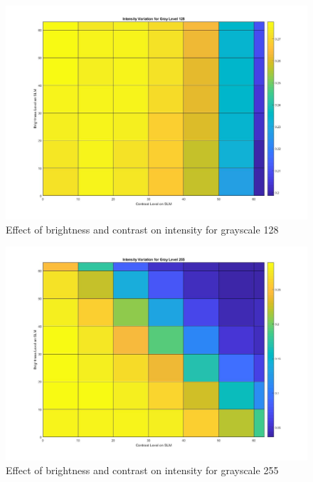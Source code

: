 \begin{figure}[h]
\centering
\includegraphics[scale=0.35]{pics/slm/slmgrayscale128.jpg}
\caption{Effect of brightness and contrast on intensity for grayscale 128}
\label{fig:slm_grayscale128}
\end{figure}

\begin{figure}[htbp]
\centering
\includegraphics[scale=0.35]{pics/slm/slmgrayscale255.jpg}
\caption{Effect of brightness and contrast on intensity for grayscale 255}
\label{fig:slm_grayscale255}
\end{figure}

